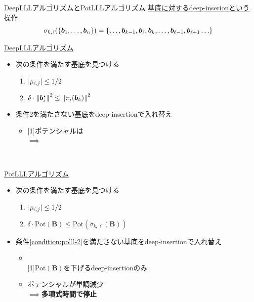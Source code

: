 \documentclass[12pt,aspectratio=169,xcolor=dvipsnames,table,dvipdfmx, leqno]{beamer}
\begin{document}
\begin{frame}{DeepLLLアルゴリズムとPotLLLアルゴリズム}
\uline{基底に対する\alert{deep-inserion}という操作}
\[
\sigma_{k, \ell}(\qty{\bm{b}_1,\ldots,\bm{b}_n})=\{\ldots, \bm{b}_{k - 1}, \bm{b}_\ell, \bm{b}_{k}, \ldots, \bm{b}_{\ell-1}, \bm{b}_{\ell+1}\ldots\}
\]
\begin{minipage}[b]{0.45\columnwidth}
    \uline{DeepLLLアルゴリズム}\cite{SE94}
    \begin{itemize}
        \item 次の条件を満たす基底を見つける
        \begin{enumerate}
            \item $\abs{\mu_{i, j}}\le 1/2$
            \item $\delta\cdot \norm{\bm{b}_i^\star}^2\le\norm{\pi_{i}(\bm{b}_k)}^2$ 
        \end{enumerate}
        \item 条件2を満たさない基底をdeep-insertionで入れ替え
        \begin{itemize}
            \item \scalebox{0.9}[1]{ポテンシャルは}\\
            $\implies$ 
        \end{itemize}
    \end{itemize}
    \mbox{}\\
\end{minipage}
\begin{minipage}[b]{0.45\columnwidth}
    \uline{PotLLLアルゴリズム}\cite{FSW14}
    \begin{itemize}
        \item 次の条件を満たす基底を見つける
        \begin{enumerate}
            \item $\abs{\mu_{i, j}}\le 1/2$
            \item $\delta\cdot \mathrm{Pot}(\bm{B})\le\mathrm{Pot}(\sigma_{k, \ell}(\bm{B}))$\label{condition:polll-2}
        \end{enumerate}
        \item 条件\ref{condition:polll-2}を満たさない基底をdeep-insertionで入れ替え
        \begin{itemize}
            \item \mbox{}\\
            \vspace{-13pt}
            \scalebox{0.9}[1]{$\mathrm{Pot}(\bm{B})$を下げるdeep-insertionのみ}
            \item ポテンシャルが単調減少\\
            $\implies$\alert{\textbf{多項式時間で停止}}
        \end{itemize}
    \end{itemize}
    \mbox{}
\end{minipage}
\end{frame}
\end{document}
